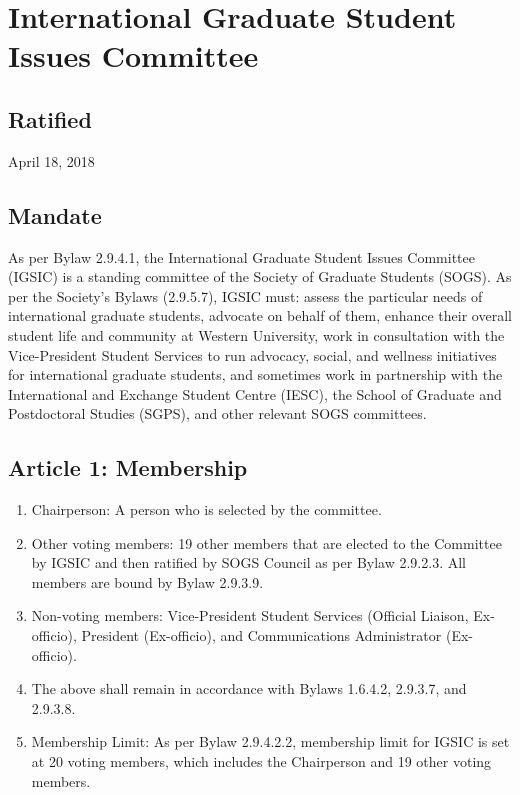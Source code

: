 \section{International Graduate Student Issues Committee}
\subsection{Ratified}
April 18, 2018
\subsection{Mandate}
As per Bylaw 2.9.4.1, the International Graduate Student Issues Committee (IGSIC) is a standing committee of the Society of Graduate Students (SOGS). As per the Society's Bylaws (2.9.5.7), IGSIC must: assess the particular needs of international graduate students, advocate on behalf of them, enhance their overall student life and community at Western University, work in consultation with the Vice-President Student Services to run advocacy, social, and wellness initiatives for international graduate students, and sometimes work in partnership with the International and Exchange Student Centre (IESC), the School of Graduate and Postdoctoral Studies (SGPS), and other relevant SOGS committees.
\subsection{Article 1: Membership}
\begin{enumerate}  [label*=\arabic*., align=left]
\item Chairperson: A person who is selected by the committee.
\item Other voting members: 19 other members that are elected to the Committee by IGSIC and
then ratified by SOGS Council as per Bylaw 2.9.2.3. All members are bound by Bylaw 2.9.3.9.
\item Non-voting members: Vice-President Student Services (Official Liaison, Ex-officio),
President (Ex-officio), and Communications Administrator (Ex-officio).
\item The above shall remain in accordance with Bylaws 1.6.4.2, 2.9.3.7, and 2.9.3.8.
\item Membership Limit: As per Bylaw 2.9.4.2.2, membership limit for IGSIC is set at 20 voting
members, which includes the Chairperson and 19 other voting members.
\end{enumerate}

